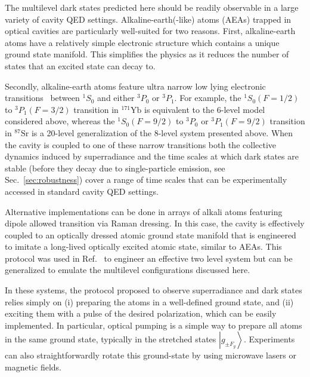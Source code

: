 \documentclass[aps,prx,superscriptaddress,twocolumn,notitlepage,nofootinbib,longbibliography]{revtex4-2}
\newcommand{\ket}[1]{\left|#1\right>}
\begin{document}
The multilevel dark states predicted here  should be readily observable in a large variety of cavity QED settings.
Alkaline-earth(-like) atoms (AEAs) trapped in optical cavities are particularly well-suited for two reasons. First, alkaline-earth atoms have a relatively simple electronic structure which contains a unique ground state manifold. This simplifies the physics as it reduces the number of states that an excited state can decay to.

Secondly, alkaline-earth atoms feature   ultra narrow low lying electronic transitions~\cite{Ludlow2015} between $^1S_0$ and either $^3P_0$ or $^3P_1$.
For example, the $^1S_0(F=1/2)$ to $^3P_1(F=3/2)$ transition in $^{171}\mathrm{Yb}$ is equivalent to the 6-level model considered above, whereas the $^1S_0(F=9/2)$ to $^3P_0$ or $^3P_1(F=9/2)$ transition in $^{87}\mathrm{Sr}$ is a 20-level generalization of  the 8-level system presented above.
When the cavity is coupled to one of these narrow  transitions both the   collective dynamics induced by superradiance and the time scales at which dark states are stable (before they decay due to single-particle emission, see Sec.~\ref{sec:robustness}) cover a range of time scales  that can be  experimentally accessed in  standard cavity QED settings.

Alternative implementations can be done in arrays of alkali atoms  featuring dipole allowed transition via Raman dressing. In this case, the cavity is effectively coupled to an optically dressed atomic ground state manifold that is engineered to imitate a long-lived optically excited atomic state, similar to AEAs. This protocol was  used in Ref.~\cite{ThompsonBohnet_Nature2012}  to engineer an effective two level system but can be generalized to emulate the multilevel  configurations discussed here.

In these systems, the protocol proposed  to observe superradiance and dark states relies simply on (i) preparing the atoms in a well-defined ground state, and (ii) exciting them with a pulse of the desired polarization, which can be easily  implemented.
In particular, optical pumping is a simple way to prepare all atoms in the same ground state, typically in the stretched states $\ket{g_{\pm F_g}}$.
Experiments can also straightforwardly rotate this ground-state by using microwave lasers or magnetic fields.
\end{document}
